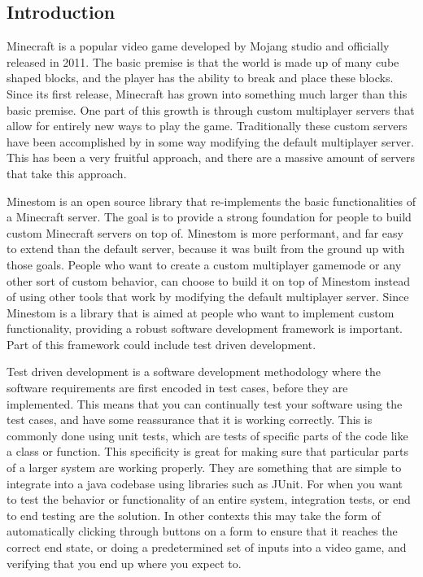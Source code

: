 \documentclass{article}
\begin{document}
\newpage %
\tableofcontents %
\listoftables %
\listoffigures %

\newpage %
\begin{doublespacing} %
\setcounter{page}{1} %

\section{Introduction} %

Minecraft is a popular video game developed by Mojang studio and officially released in 2011. The basic premise is that the world is made up of many cube shaped blocks, and the player has the ability to break and place these blocks. Since its first release, Minecraft has grown into something much larger than this basic premise. One part of this growth is through custom multiplayer servers that allow for entirely new ways to play the game. Traditionally these custom servers have been accomplished by in some way modifying the default multiplayer server. This has been a very fruitful approach, and there are a massive amount of servers that take this approach. 

Minestom is an open source library that re-implements the basic functionalities of a Minecraft server. The goal is to provide a strong foundation for people to build custom Minecraft servers on top of. Minestom is more performant, and far easy to extend than the default server, because it was built from the ground up with those goals. People who want to create a custom multiplayer gamemode or any other sort of custom behavior, can choose to build it on top of Minestom instead of using other tools that work by modifying the default multiplayer server. Since Minestom is a library that is aimed at people who want to implement custom functionality, providing a robust software development framework is important. Part of this framework could include test driven development. 

Test driven development is a software development methodology where the software requirements are first encoded in test cases, before they are implemented. This means that you can continually test your software using the test cases, and have some reassurance that it is working correctly. This is commonly done using unit tests, which are tests of specific parts of the code like a class or function. This specificity is great for making sure that particular parts of a larger system are working properly. They are something that are simple to integrate into a java codebase using libraries such as JUnit. For when you want to test the behavior or functionality of an entire system, integration tests, or end to end testing are the solution. In other contexts this may take the form of automatically clicking through buttons on a form to ensure that it reaches the correct end state, or doing a predetermined set of inputs into a video game, and verifying that you end up where you expect to. 


\end{doublespacing}
\end{document}
